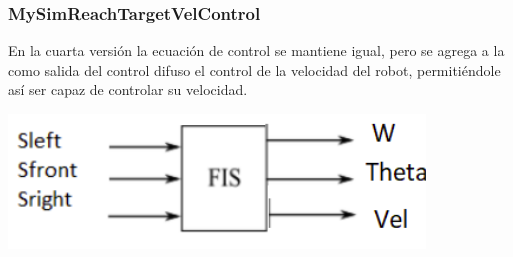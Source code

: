 \begin{figure}[ht]
\centering
{}
\end{figure}

\subsubsection{MySimReachTargetVelControl}

En la cuarta versión la ecuación de control se mantiene igual, pero se agrega a la como salida del control difuso el control de la velocidad del robot, permitiéndole así ser capaz de controlar su velocidad.

\begin{center}
    \includegraphics[scale=0.5]{Tesis/Capitulos/04_CAPITULO_2/img/esquema4.png}
\end{center}


